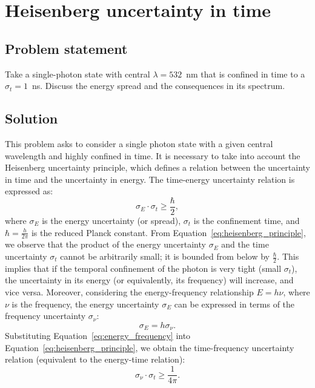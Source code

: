 \documentclass[prl, 11 pt]{revtex4-2}
\begin{document}
\newpage
\section{Heisenberg uncertainty in time}
\subsection{Problem statement}
Take a single-photon state with central $\lambda = 532$~nm that is confined in time to a $\sigma_t = 1$~ns. Discuss the energy spread and the consequences in its spectrum.

\subsection{Solution}
This problem asks to consider a single photon state with a given central wavelength and highly confined in time. It is necessary to take into account the Heisenberg uncertainty principle, which defines a relation between the uncertainty in time and the uncertainty in energy. The time-energy uncertainty relation is expressed as:
%
\begin{equation}
    \label{eq:heisenberg_principle}
    \sigma_E \cdot \sigma_t \geq \frac{\hbar}{2},
\end{equation}
%
where $\sigma_E$ is the energy uncertainty (or spread), $\sigma_t$ is the confinement time, and $\hbar = \frac{h}{2\pi}$ is the reduced Planck constant. From Equation~\eqref{eq:heisenberg_principle}, we observe that the product of the energy uncertainty $\sigma_E$ and the time uncertainty $\sigma_t$ cannot be arbitrarily small; it is bounded from below by $\frac{\hbar}{2}$. This implies that if the temporal confinement of the photon is very tight (small $\sigma_t$), the uncertainty in its energy (or equivalently, its frequency) will increase, and vice versa. Moreover, considering the energy-frequency relationship $E = h\nu$, where $\nu$ is the frequency, the energy uncertainty $\sigma_E$ can be expressed in terms of the frequency uncertainty $\sigma_\nu$:
%
\begin{equation}
    \label{eq:energy_frequency}
    \sigma_E = h \sigma_\nu.
\end{equation}
%
Substituting Equation~\eqref{eq:energy_frequency} into Equation~\eqref{eq:heisenberg_principle}, we obtain the time-frequency uncertainty relation (equivalent to the energy-time relation):
%
\begin{equation}
    \label{eq:time_frequency}
    \sigma_\nu \cdot \sigma_t \geq \frac{1}{4\pi}.
\end{equation}
\end{document}
